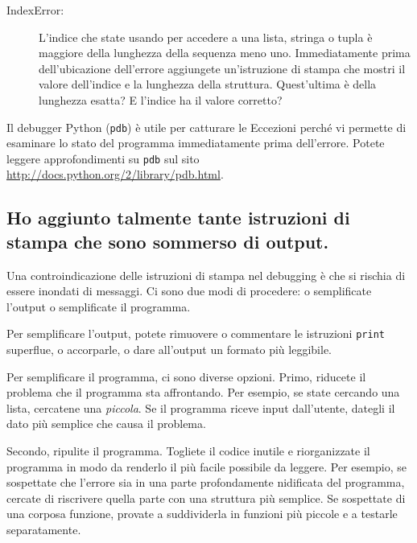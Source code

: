 \documentclass[10pt]{book}
\begin{document}
\begin{description}
\item[IndexError:] L'indice che state usando per accedere a una lista, stringa o tupla è maggiore della lunghezza della sequenza meno uno. Immediatamente prima dell'ubicazione dell'errore aggiungete un'istruzione di stampa che mostri il valore dell'indice e la lunghezza della struttura. Quest'ultima è della lunghezza esatta? E l'indice ha il valore corretto?

\end{description}

Il debugger Python ({\tt pdb}) è utile per catturare le Eccezioni perché vi permette di esaminare lo stato del programma immediatamente prima dell'errore. Potete leggere approfondimenti su {\tt pdb} sul sito \url{http://docs.python.org/2/library/pdb.html}.


\subsection{Ho aggiunto talmente tante istruzioni di stampa che sono sommerso di output.}

Una controindicazione delle istruzioni di stampa nel debugging è che si rischia di essere inondati di messaggi. Ci sono due modi di procedere: o semplificate l'output o semplificate il programma.

Per semplificare l'output, potete rimuovere o commentare le istruzioni {\tt print} superflue, o accorparle, o dare all'output un formato più leggibile.

Per semplificare il programma, ci sono diverse opzioni. Primo, riducete il problema che il programma sta affrontando. Per esempio, se state cercando una lista, cercatene una {\em piccola}.  Se il programma riceve input dall'utente, dategli il dato più semplice che causa il problema.

Secondo, ripulite il programma. Togliete il codice inutile e riorganizzate il programma in modo da renderlo il più facile possibile da leggere. Per esempio, se sospettate che l'errore sia in una parte profondamente nidificata del programma, cercate di riscrivere quella parte con una struttura più semplice. Se sospettate di una corposa funzione, provate a suddividerla in funzioni più piccole e a testarle separatamente.
\end{document}
